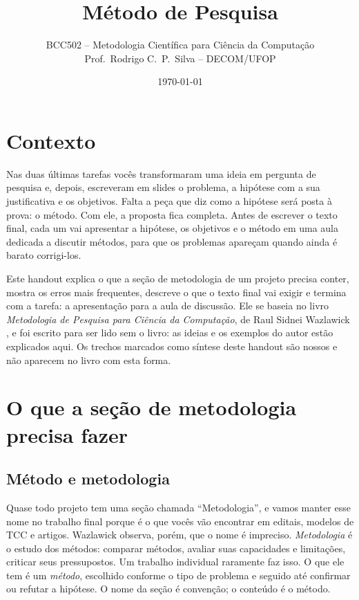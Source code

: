 \documentclass[10pt,a4paper]{extarticle}
\title{Método de Pesquisa}
\author{BCC502 -- Metodologia Científica para Ciência da Computação\\Prof.\ Rodrigo C.\ P.\ Silva -- DECOM/UFOP}
\date{\today}
\theoremstyle{definition}
\begin{document}
\maketitle
\thispagestyle{fancy}
\tableofcontents

\section*{Contexto}

Nas duas últimas tarefas vocês transformaram uma ideia em pergunta de pesquisa e, depois, escreveram em slides o problema, a hipótese com a sua justificativa e os objetivos. Falta a peça que diz como a hipótese será posta à prova: o método. Com ele, a proposta fica completa. Antes de escrever o texto final, cada um vai apresentar a hipótese, os objetivos e o método em uma aula dedicada a discutir métodos, para que os problemas apareçam quando ainda é barato corrigi-los.

Este handout explica o que a seção de metodologia de um projeto precisa conter, mostra os erros mais frequentes, descreve o que o texto final vai exigir e termina com a tarefa: a apresentação para a aula de discussão. Ele se baseia no livro \emph{Metodologia de Pesquisa para Ciência da Computação}, de Raul Sidnei Wazlawick \cite{wazlawick2020}, e foi escrito para ser lido sem o livro: as ideias e os exemplos do autor estão explicados aqui. Os trechos marcados como síntese deste handout são nossos e não aparecem no livro com esta forma.

\section{O que a seção de metodologia precisa fazer}\label{sec:funcao}

\subsection{Método e metodologia}

Quase todo projeto tem uma seção chamada \enquote{Metodologia}, e vamos manter esse nome no trabalho final porque é o que vocês vão encontrar em editais, modelos de TCC e artigos. Wazlawick observa, porém, que o nome é impreciso. \emph{Metodologia} é o estudo dos métodos: comparar métodos, avaliar suas capacidades e limitações, criticar seus pressupostos. Um trabalho individual raramente faz isso. O que ele tem é um \emph{método}, escolhido conforme o tipo de problema e seguido até confirmar ou refutar a hipótese. O nome da seção é convenção; o conteúdo é o método.
\end{document}
